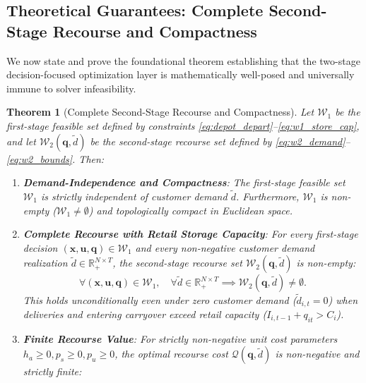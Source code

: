 \documentclass[11pt,a4paper]{article}
\newtheorem{theorem}{Theorem}
\theoremstyle{definition}
\theoremstyle{remark}
\begin{document}
\subsection{Theoretical Guarantees: Complete Second-Stage Recourse and Compactness}
\label{sec:theoretical_guarantees}

We now state and prove the foundational theorem establishing that the two-stage decision-focused optimization layer is mathematically well-posed and universally immune to solver infeasibility.

\begin{theorem}[Complete Second-Stage Recourse and Compactness]
\label{thm:recourse_feasibility}
Let $\mathcal{W}_1$ be the first-stage feasible set defined by constraints \eqref{eq:depot_depart}--\eqref{eq:w1_store_cap}, and let $\mathcal{W}_2(\mathbf{q}, \tilde{d})$ be the second-stage recourse set defined by \eqref{eq:w2_demand}--\eqref{eq:w2_bounds}. Then:
\begin{enumerate}[label=(\roman*)]
    \item \textbf{Demand-Independence and Compactness}: The first-stage feasible set $\mathcal{W}_1$ is strictly independent of customer demand $\tilde{d}$. Furthermore, $\mathcal{W}_1$ is non-empty ($\mathcal{W}_1 \neq \emptyset$) and topologically compact in Euclidean space.
    \item \textbf{Complete Recourse with Retail Storage Capacity}: For every first-stage decision $(\mathbf{x}, \mathbf{u}, \mathbf{q}) \in \mathcal{W}_1$ and every non-negative customer demand realization $\tilde{d} \in \mathbb{R}_+^{N \times T}$, the second-stage recourse set $\mathcal{W}_2(\mathbf{q}, \tilde{d})$ is non-empty:
    \begin{equation*}
        \forall (\mathbf{x}, \mathbf{u}, \mathbf{q}) \in \mathcal{W}_1, \quad \forall \tilde{d} \in \mathbb{R}_+^{N \times T} \implies \mathcal{W}_2(\mathbf{q}, \tilde{d}) \neq \emptyset.
    \end{equation*}
    This holds unconditionally even under zero customer demand ($\tilde{d}_{i,t} = 0$) when deliveries and entering carryover exceed retail capacity ($I_{i,t-1} + q_{it} > C_i$).
    \item \textbf{Finite Recourse Value}: For strictly non-negative unit cost parameters $h_a \ge 0, p_s \ge 0, p_u \ge 0$, the optimal recourse cost $\mathcal{Q}(\mathbf{q}, \tilde{d})$ is non-negative and strictly finite:

\end{enumerate}
\end{theorem}
\end{document}
